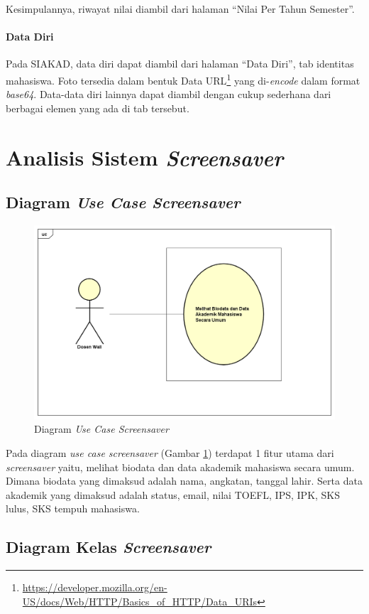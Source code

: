 Kesimpulannya, riwayat nilai diambil dari halaman ``Nilai Per Tahun Semester''.

\paragraph{Data Diri} Pada SIAKAD, data diri dapat diambil dari halaman ``Data Diri'', tab identitas mahasiswa. Foto tersedia dalam bentuk Data URL\footnote{\url{https://developer.mozilla.org/en-US/docs/Web/HTTP/Basics_of_HTTP/Data_URIs}} yang di-\textit{encode} dalam format \textit{base64}. Data-data diri lainnya dapat diambil dengan cukup sederhana dari berbagai elemen yang ada di tab tersebut.

\section{Analisis Sistem \textit{Screensaver}}

\subsection{Diagram \textit{Use Case Screensaver}}

\begin{figure}[H]
	\centering
	\includegraphics[scale=0.45]{Gambar/UseCase.png}
	\caption{Diagram \textit{Use Case Screensaver}}
	\label{fig:3_usecase_diagram}
\end{figure}
    
Pada diagram \textit{use case screensaver} (Gambar \ref{fig:3_usecase_diagram}) terdapat 1 fitur utama
dari \textit{screensaver} yaitu, melihat biodata dan data akademik mahasiswa secara umum. Dimana biodata yang dimaksud adalah nama, angkatan, tanggal lahir. Serta data akademik yang dimaksud adalah status, email, nilai TOEFL, IPS, IPK, SKS lulus, SKS tempuh mahasiswa.


\subsection{Diagram Kelas \textit{Screensaver}}




